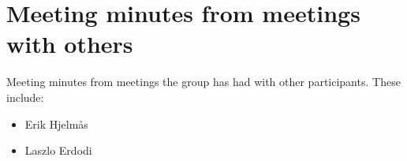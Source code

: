 \chapter{Meeting minutes from meetings with others}
Meeting minutes from meetings the group has had with other participants. These include:
\begin{itemize}
    \item Erik Hjelmås
    \item Laszlo Erdodi
\end{itemize}
\newpage

\newpage
